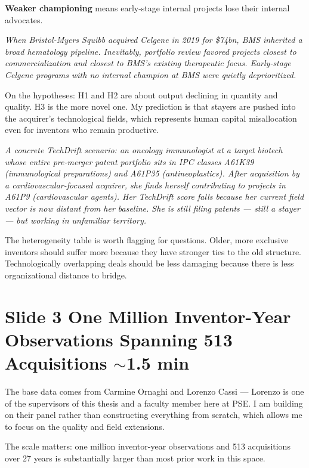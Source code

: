 \documentclass[11pt,a4paper]{article}
\newcommand{\example}[1]{%
  \begin{trivlist}
    \item\relax
    \colorbox{examplebg}{\parbox{\dimexpr\linewidth-2\fboxsep}%
      {\small\itshape\color{darkblue!80} #1}}
  \end{trivlist}%
}
\begin{document}
\textbf{Weaker championing} means early-stage internal projects lose their internal advocates.

\example{When Bristol-Myers Squibb acquired Celgene in 2019 for \$74bn, BMS inherited a broad hematology pipeline. Inevitably, portfolio review favored projects closest to commercialization and closest to BMS's existing therapeutic focus. Early-stage Celgene programs with no internal champion at BMS were quietly deprioritized.}

On the hypotheses: H1 and H2 are about output declining in quantity and quality. H3 is the more novel one. My prediction is that stayers are pushed into the acquirer's technological fields, which represents human capital misallocation even for inventors who remain productive.

\example{A concrete TechDrift scenario: an oncology immunologist at a target biotech whose entire pre-merger patent portfolio sits in IPC classes A61K39 (immunological preparations) and A61P35 (antineoplastics). After acquisition by a cardiovascular-focused acquirer, she finds herself contributing to projects in A61P9 (cardiovascular agents). Her TechDrift score falls because her current field vector is now distant from her baseline. She is still filing patents --- still a stayer --- but working in unfamiliar territory.}

The heterogeneity table is worth flagging for questions. Older, more exclusive inventors should suffer more because they have stronger ties to the old structure. Technologically overlapping deals should be less damaging because there is less organizational distance to bridge.

\section*{Slide 3 \quad One Million Inventor-Year Observations Spanning 513 Acquisitions \hfill{\normalfont\small\color{midgray}$\sim$1.5 min}}

The base data comes from Carmine Ornaghi and Lorenzo Cassi --- Lorenzo is one of the supervisors of this thesis and a faculty member here at PSE. I am building on their panel rather than constructing everything from scratch, which allows me to focus on the quality and field extensions.

The scale matters: one million inventor-year observations and 513 acquisitions over 27 years is substantially larger than most prior work in this space.
\end{document}
